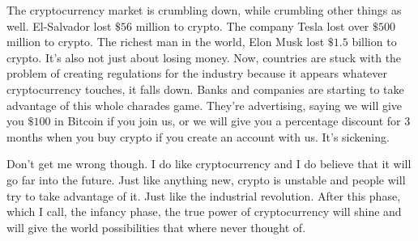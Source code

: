 \begin{essay}

  The cryptocurrency market is crumbling down, while crumbling other things as
  well. El-Salvador lost $\$56$ million to crypto. The company Tesla lost over
  $\$500$ million to crypto. The richest man in the world, Elon Musk lost
  $\$1.5$ billion to crypto. It's also not just about losing money. Now,
  countries are stuck with the problem of creating regulations for the industry
  because it appears whatever cryptocurrency touches, it falls down. Banks and
  companies are starting to take advantage of this whole charades game. They're
  advertising, saying we will give you $\$100$ in Bitcoin if you join us, or we
  will give you a percentage discount for $3$ months when you buy crypto if you
  create an account with us. It's sickening.


  Don't get me wrong though. I do like cryptocurrency and I do believe that it
  will go far into the future. Just like anything new, crypto is unstable and
  people will try to take advantage of it. Just like the industrial revolution.
  After this phase, which I call, the infancy phase, the true power of
  cryptocurrency will shine and will give the world possibilities that where
  never thought of.
\end{essay}
